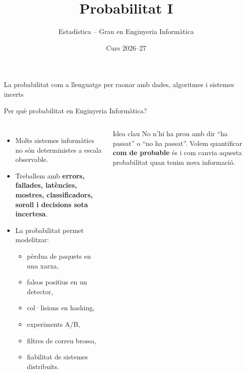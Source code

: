 \documentclass[10pt,aspectratio=169]{beamer}
\title[Probabilitat computacional]{Probabilitat I}
\author{Estadística -- Grau en Enginyeria Informàtica}
\date{Curs 2026--27}
\newcommand{\important}[1]{\textcolor{UABGreen}{\textbf{#1}}}
\begin{document}
\begin{frame}[plain]
  \titlepage
  \vspace{-0.5cm}
  \begin{center}
  \small
  \textcolor{DeepBlue}{La probabilitat com a llenguatge per raonar amb dades, algoritmes i sistemes incerts}
  \end{center}
\end{frame}

\begin{frame}{Per què probabilitat en Enginyeria Informàtica?}
\begin{columns}[T]
\begin{itemize}
  \item Molts sistemes informàtics no són deterministes a escala observable.
  \item Treballem amb \important{errors, fallades, latències, mostres, classificadors, soroll i decisions sota incertesa}.
  \item La probabilitat permet modelitzar:
  \begin{itemize}
    \item pèrdua de paquets en una xarxa,
    \item falsos positius en un detector,
    \item col·lisions en hashing,
    \item experiments A/B,
    \item filtres de correu brossa,
    \item fiabilitat de sistemes distribuïts.
  \end{itemize}
\end{itemize}
\begin{block}{Idea clau}
No n'hi ha prou amb dir ``ha passat'' o ``no ha passat''. Volem quantificar \important{com de probable} és i com canvia aquesta probabilitat quan tenim nova informació.
\end{block}
\vspace{0.2cm}
\end{columns}
\end{frame}
\end{document}
